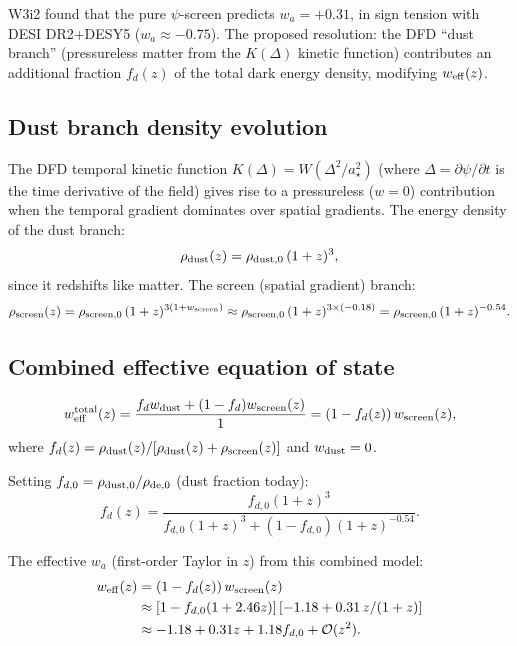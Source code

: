 \documentclass[11pt]{article}
\newcommand{\astar}{a_\star}
\begin{document}
W3i2 found that the pure $\psi$-screen predicts $w_a = +0.31$, in
sign tension with DESI DR2+DESY5 ($w_a \approx -0.75$).  The proposed
resolution: the DFD ``dust branch'' (pressureless matter from the
$K(\Delta)$ kinetic function) contributes an additional fraction
$f_d(z)$ of the total dark energy density, modifying $w_{\rm eff}(z)$.

\subsection{Dust branch density evolution}

The DFD temporal kinetic function $K(\Delta) = W(\Delta^2/\astar^2)$
(where $\Delta = \partial\psi/\partial t$ is the time derivative of
the field) gives rise to a pressureless ($w = 0$) contribution when
the temporal gradient dominates over spatial gradients.  The energy
density of the dust branch:
\begin{equation}
  \rho_{\rm dust}(z) = \rho_{\rm dust,0}\,(1+z)^3,
\end{equation}
since it redshifts like matter.  The screen (spatial gradient) branch:
\begin{equation}
  \rho_{\rm screen}(z) = \rho_{\rm screen,0}\,(1+z)^{3(1+w_{\rm screen})}
  \approx \rho_{\rm screen,0}\,(1+z)^{3\times(-0.18)} = \rho_{\rm screen,0}\,(1+z)^{-0.54}.
\end{equation}

\subsection{Combined effective equation of state}

\begin{equation}
  w_{\rm eff}^{\rm total}(z) = \frac{f_d w_{\rm dust} + (1-f_d)w_{\rm screen}(z)}{1}
  = (1-f_d(z))\,w_{\rm screen}(z),
\end{equation}
where $f_d(z) = \rho_{\rm dust}(z)/[\rho_{\rm dust}(z) + \rho_{\rm screen}(z)]$
and $w_{\rm dust} = 0$.

Setting $f_{d,0} = \rho_{\rm dust,0}/\rho_{\rm de,0}$ (dust fraction today):
\begin{equation}
  f_d(z) = \frac{f_{d,0}(1+z)^3}{f_{d,0}(1+z)^3 + (1-f_{d,0})(1+z)^{-0.54}}.
\end{equation}

The effective $w_a$ (first-order Taylor in $z$) from this combined model:
\begin{align}
  w_{\rm eff}(z) &= (1 - f_d(z))\,w_{\rm screen}(z) \nonumber\\
  &\approx [1 - f_{d,0}(1 + 2.46z)]\,[-1.18 + 0.31\,z/(1+z)] \nonumber\\
  &\approx -1.18 + 0.31z + 1.18f_{d,0} + \mathcal{O}(z^2).
\end{align}
\end{document}
